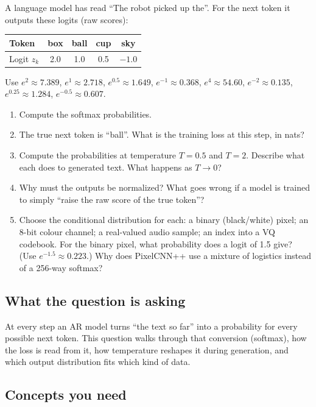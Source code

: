 \documentclass[12pt,a4paper]{article}
\begin{document}
A language model has read ``The robot picked up the''. For the next token it outputs these logits (raw scores):
\begin{center}
\begin{tabular}{@{}lcccc@{}}
\toprule
Token & box & ball & cup & sky \\
\midrule
Logit $z_k$ & 2.0 & 1.0 & 0.5 & $-1.0$ \\
\bottomrule
\end{tabular}
\end{center}
Use $e^{2}\approx7.389$, $e^{1}\approx2.718$, $e^{0.5}\approx1.649$, $e^{-1}\approx0.368$, $e^{4}\approx54.60$, $e^{-2}\approx0.135$, $e^{0.25}\approx1.284$, $e^{-0.5}\approx0.607$.
\begin{enumerate}[label=(\alph*)]
  \item[\colorbox{yellow}{(a)}] Compute the softmax probabilities.
  \item The true next token is ``ball''. What is the training loss at this step, in nats?
  \item[\colorbox{yellow}{(c)}] Compute the probabilities at temperature $T=0.5$ and $T=2$. Describe what each does to generated text. What happens as $T\to0$?
  \item[\colorbox{yellow}{(d)}] Why must the outputs be normalized? What goes wrong if a model is trained to simply ``raise the raw score of the true token''?
  \item[\colorbox{yellow}{(e)}] Choose the conditional distribution for each: a binary (black/white) pixel; an 8-bit colour channel; a real-valued audio sample; an index into a VQ codebook. For the binary pixel, what probability does a logit of 1.5 give? (Use $e^{-1.5}\approx0.223$.) Why does PixelCNN++ use a mixture of logistics instead of a 256-way softmax?
\end{enumerate}

\subsection{What the question is asking}

At every step an AR model turns ``the text so far'' into a probability for every possible next token. This question walks through that conversion (softmax), how the loss is read from it, how temperature reshapes it during generation, and which output distribution fits which kind of data.

\subsection{Concepts you need}
\end{document}
